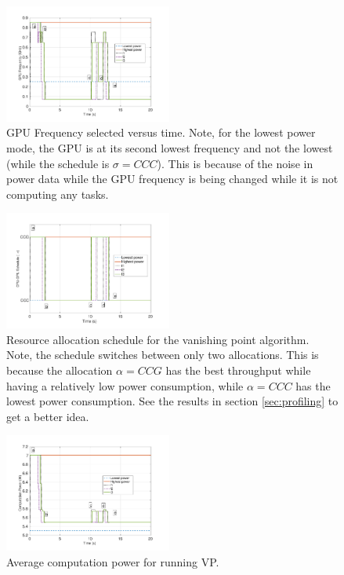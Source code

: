 \begin{figure}[hbtp]
\centering
\includegraphics[width=0.49\textwidth]{../simulations/figs/GPUF.pdf}
\caption{GPU Frequency selected versus time. Note, for the lowest power mode, the GPU is at its second lowest frequency and not the lowest (while the schedule is $\sigma=CCC$). This is because of the noise in power data while the GPU frequency is being changed while it is not computing any tasks.}
\label{fig:gpuf} 
\end{figure}


\begin{figure}[hbtp]
\centering
\includegraphics[width=0.49\textwidth]{../simulations/figs/schedule.pdf}
\caption{Resource allocation schedule for the vanishing point algorithm. Note, the schedule switches between only two allocations. This is because the allocation $\alpha=CCG$ has the best throughput while having a relatively low power consumption, while $\alpha=CCC$ has the lowest power consumption. See the results in section \ref{sec:profiling} to get a better idea.}
\label{fig:schedule} 
\end{figure}

\begin{figure}[hbtp]
\centering
\includegraphics[width=0.49\textwidth]{../simulations/figs/power.pdf}
\caption{Average computation power for running VP.}
\label{fig:power} 
\end{figure}

